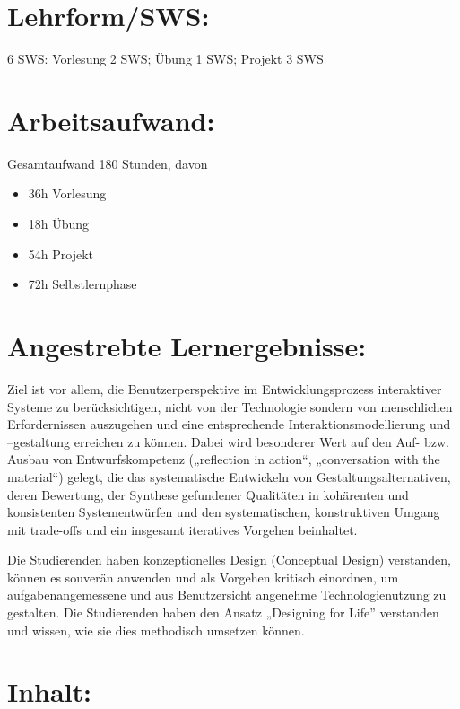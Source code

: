 \section*{Lehrform/SWS:}\label{lehrformsws-5}

6 SWS: Vorlesung 2 SWS; Übung 1 SWS; Projekt 3 SWS

\section*{Arbeitsaufwand:}\label{arbeitsaufwand-6}

Gesamtaufwand 180 Stunden, davon

\begin{itemize}
\tightlist
\item
  36h Vorlesung
\item
  18h Übung
\item
  54h Projekt
\item
  72h Selbstlernphase
\end{itemize}

\section*{Angestrebte
Lernergebnisse:}\label{angestrebte-lernergebnisse-5}

Ziel ist vor allem, die Benutzerperspektive im Entwicklungsprozess
interaktiver Systeme zu berücksichtigen, nicht von der Technologie
sondern von menschlichen Erfordernissen auszugehen und eine
entsprechende Interaktionsmodellierung und --gestaltung erreichen zu
können. Dabei wird besonderer Wert auf den Auf- bzw. Ausbau von
Entwurfskompetenz („reflection in action``, „conversation with the
material``) gelegt, die das systematische Entwickeln von
Gestaltungsalternativen, deren Bewertung, der Synthese gefundener
Qualitäten in kohärenten und konsistenten Systementwürfen und den
systematischen, konstruktiven Umgang mit trade-offs und ein insgesamt
iteratives Vorgehen beinhaltet.

Die Studierenden haben konzeptionelles Design (Conceptual Design)
verstanden, können es souverän anwenden und als Vorgehen kritisch
einordnen, um aufgabenangemessene und aus Benutzersicht angenehme
Technologienutzung zu gestalten. Die Studierenden haben den Ansatz
„Designing for Life'' verstanden und wissen, wie sie dies methodisch
umsetzen können.

\section*{Inhalt:}\label{inhalt-5}

